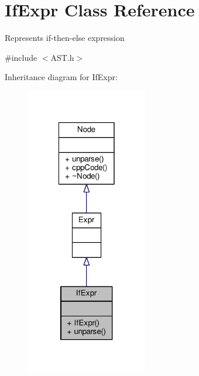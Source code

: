 \hypertarget{classIfExpr}{\section{If\-Expr Class Reference}
\label{classIfExpr}
}


Represents if-\/then-\/else expression \par
  




{\ttfamily \#include $<$A\-S\-T.\-h$>$}



Inheritance diagram for If\-Expr\-:\nopagebreak
\begin{figure}[H]
\begin{center}
\leavevmode
\includegraphics[width=150pt]{classIfExpr__inherit__graph}
\end{center}
\end{figure}


